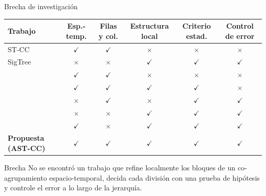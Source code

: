 \documentclass[aspectratio=169,10pt,t]{beamer}
\newcommand{\ck}{{\color{okgreen}$\checkmark$}}
\newcommand{\cx}{{\color{badred}$\times$}}
\newcommand{\STCC}{ST-CC}
\newcommand{\ASTCC}{AST-CC}
\begin{document}
\begin{frame}{Brecha de investigación}
  \centering\footnotesize
  \setlength{\tabcolsep}{4pt}
  \begin{tabular}{@{}l c c c c c@{}}
    \toprule
    Trabajo & Esp.-temp. & Filas y col. & Estructura local & Criterio estad. & Control de error \\
    \midrule
    \STCC\ \cite{Liu2021}          & \ck & \ck & \cx & \cx & \cx \\
    SigTree \cite{Hu2025}          & \cx & \cx & \ck & \ck & \ck \\
    \midrule
    \cite{Wu2022}                  & \ck & \ck & \cx & \cx & \cx \\
    \cite{Neves2022}               & \ck & \ck & \ck & \ck & \cx \\
    \cite{Watanabe2021si}          & \cx & \ck & \cx & \ck & \ck \\
    \cite{Gao2024}                 & \cx & \cx & \ck & \ck & \ck \\
    \cite{Shiode2022}              & \ck & \cx & \ck & \ck & \ck \\
    \midrule
    \textbf{Propuesta (\ASTCC)}    & \ck & \ck & \ck & \ck & \ck \\
    \bottomrule
  \end{tabular}
  \vspace{1ex}
  \small
  \begin{alertblock}{Brecha}
    No se encontró un trabajo que \alert{refine localmente} los bloques de un co-agrupamiento
    espacio-temporal, \alert{decida cada división con una prueba de hipótesis} y
    \alert{controle el error} a lo largo de la jerarquía.
  \end{alertblock}
\end{frame}
\end{document}
